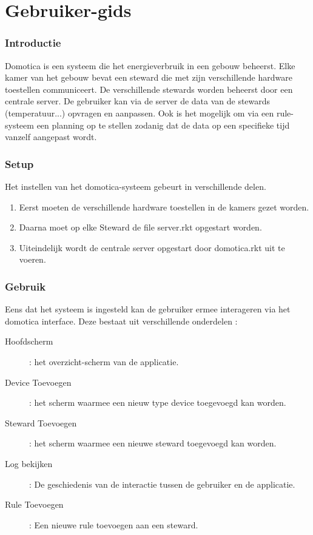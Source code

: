 \documentclass{article}
\begin{document}
	\part*{Gebruiker-gids}
	
	\section{Introductie}
Domotica is een systeem die het energieverbruik in een gebouw beheerst. Elke kamer van het gebouw bevat een steward die met zijn verschillende hardware toestellen communiceert. De verschillende stewards worden beheerst door een centrale server. De gebruiker kan via de server de data van de stewards (temperatuur...) opvragen en aanpassen. Ook is het
mogelijk om via een rule-systeem een planning op te stellen zodanig dat de data op een specifieke tijd vanzelf aangepast wordt.

	\section{Setup}
	\label{setup}
Het instellen van het domotica-systeem gebeurt in verschillende delen.

		\begin{enumerate}
			\item Eerst moeten de verschillende hardware toestellen in de kamers gezet worden.
			\item Daarna moet op elke Steward de file server.rkt opgestart worden.
			\item Uiteindelijk wordt de centrale server opgestart door domotica.rkt uit te voeren.
		\end{enumerate}
		
	\section{Gebruik}
	\label{use}
Eens dat het systeem is ingesteld kan de gebruiker ermee interageren via het domotica interface.
Deze bestaat uit verschillende onderdelen :
	
	\begin{description}
		\item[Hoofdscherm] : het overzicht-scherm van de applicatie.
		\item[Device Toevoegen] : het scherm waarmee een nieuw type device toegevoegd kan worden.
		\item[Steward Toevoegen] : het scherm waarmee een nieuwe steward toegevoegd kan worden.
		\item[Log bekijken] : De geschiedenis van de interactie tussen de gebruiker en de applicatie.
		\item[Rule Toevoegen] : Een nieuwe rule toevoegen aan een steward.
	\end{description}
	
\end{document}
